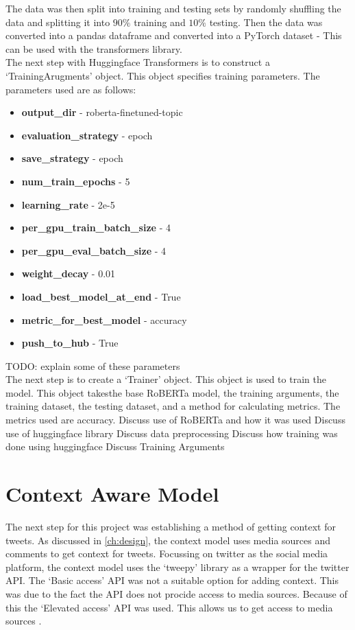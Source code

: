 The data was then split into training and testing sets by randomly shuffling the data and splitting it into $90\%$ training and $10\%$ testing.
Then the data was converted into a pandas dataframe and converted into a PyTorch dataset - This can be used with the transformers library.\\
The next step with Huggingface Transformers is to construct a `TrainingArugments' object. This object specifies training parameters. The parameters
used are as follows:
\begin{itemize}
    \item \textbf{output\_dir} - roberta-finetuned-topic
    \item \textbf{evaluation\_strategy} - epoch
    \item \textbf{save\_strategy} - epoch
    \item \textbf{num\_train\_epochs} - 5
    \item \textbf{learning\_rate} - 2e-5
    \item \textbf{per\_gpu\_train\_batch\_size} - 4
    \item \textbf{per\_gpu\_eval\_batch\_size} - 4
    \item \textbf{weight\_decay} - 0.01
    \item \textbf{load\_best\_model\_at\_end} - True
    \item \textbf{metric\_for\_best\_model} - accuracy
    \item \textbf{push\_to\_hub} - True
\end{itemize}

TODO: explain some of these parameters\\
The next step is to create a `Trainer' object. This object is used to train the model. This object takesthe base RoBERTa model, the training arguments,
the training dataset, the testing dataset, and a method for calculating metrics. The metrics used are accuracy. 
Discuss use of RoBERTa and how it was used
Discuss use of huggingface library
Discuss data preprocessing
Discuss how training was done using huggingface
Discuss Training Arguments
\section{Context Aware Model}\label{sec:context_aware_model}
The next step for this project was establishing a method of getting context for tweets. As discussed in \cref{ch:design}, the context model uses
media sources and comments to get context for tweets. Focussing on twitter as the social media platform, the context model uses the `tweepy' library
as a wrapper for the twitter API. The `Basic access' API was not a suitable option for adding context. This was due to the fact the API does not
procide access to media sources. Because of this the `Elevated access' API was used. This allows us to get access to media sources \cite{twitter_developer_nodate}.
